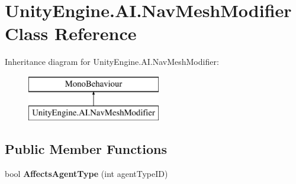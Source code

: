 \hypertarget{class_unity_engine_1_1_a_i_1_1_nav_mesh_modifier}{}\section{Unity\+Engine.\+A\+I.\+Nav\+Mesh\+Modifier Class Reference}
\label{class_unity_engine_1_1_a_i_1_1_nav_mesh_modifier}
Inheritance diagram for Unity\+Engine.\+A\+I.\+Nav\+Mesh\+Modifier\+:\begin{figure}[H]
\begin{center}
\leavevmode
\includegraphics[height=2.000000cm]{class_unity_engine_1_1_a_i_1_1_nav_mesh_modifier}
\end{center}
\end{figure}
\subsection*{Public Member Functions}
\begin{DoxyCompactItemize}
\item 
\mbox{\label{class_unity_engine_1_1_a_i_1_1_nav_mesh_modifier_aab88e8190e44bd9414e7d1628436b0b6}} 
bool {\bfseries Affects\+Agent\+Type} (int agent\+Type\+ID)
\end{DoxyCompactItemize}
